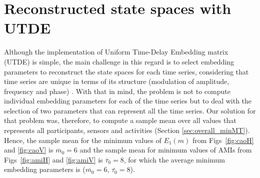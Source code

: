 \section{Reconstructed state spaces with UTDE}
Although the implementation of Uniform Time-Delay Embedding matrix (UTDE) 
is simple, the main challenge in this regard is to select embedding parameters 
to reconstruct the state spaces for each time series, considering that time 
series are unique in terms of its structure (modulation of amplitude, 
frequency and phase) \citep{ frank2010, sama2013, bradley2015}.
With that in mind, the problem is not to compute individual embedding parameters 
for each of the time series but to deal with the selection of two parameters 
that can represent all the time series. 
Our solution for that problem was, therefore, to compute a sample mean over 
all values that represents all participants, sensors and activities 
(Section \ref{sec:overall_minMT}).
Hence, the sample mean for the minimum values of $E_{1}(m)$ from 
Figs~\ref{fig:caoH} and \ref{fig:caoV} is $\overline{m}_0=6$ and the sample 
mean for minimum values of AMIs from Figs~\ref{fig:amiH} and \ref{fig:amiV} 
is $\overline{\tau}_0=8$, for which the average minimum embedding parameters 
is ($\overline{m_0}=6$, $\overline{\tau_0}=8$).

